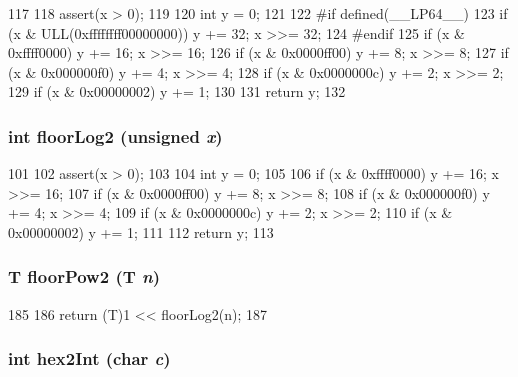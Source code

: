 \begin{DoxyCode}
117 {
118     assert(x > 0);
119 
120     int y = 0;
121 
122 #if defined(__LP64__)
123     if (x & ULL(0xffffffff00000000)) { y += 32; x >>= 32; }
124 #endif
125     if (x & 0xffff0000) { y += 16; x >>= 16; }
126     if (x & 0x0000ff00) { y +=  8; x >>=  8; }
127     if (x & 0x000000f0) { y +=  4; x >>=  4; }
128     if (x & 0x0000000c) { y +=  2; x >>=  2; }
129     if (x & 0x00000002) { y +=  1; }
130 
131     return y;
132 }
\end{DoxyCode}
\hypertarget{intmath_8hh_ad61f5307b84292529da332fee695614e}{
\subsubsection[{floorLog2}]{\setlength{\rightskip}{0pt plus 5cm}int floorLog2 (unsigned {\em x})}}
\label{intmath_8hh_ad61f5307b84292529da332fee695614e}



\begin{DoxyCode}
101 {
102     assert(x > 0);
103 
104     int y = 0;
105 
106     if (x & 0xffff0000) { y += 16; x >>= 16; }
107     if (x & 0x0000ff00) { y +=  8; x >>=  8; }
108     if (x & 0x000000f0) { y +=  4; x >>=  4; }
109     if (x & 0x0000000c) { y +=  2; x >>=  2; }
110     if (x & 0x00000002) { y +=  1; }
111 
112     return y;
113 }
\end{DoxyCode}
\hypertarget{intmath_8hh_a9486f78f0d06687602e134537d9bfe3a}{
\subsubsection[{floorPow2}]{\setlength{\rightskip}{0pt plus 5cm}T floorPow2 (T {\em n})}}
\label{intmath_8hh_a9486f78f0d06687602e134537d9bfe3a}



\begin{DoxyCode}
185 {
186     return (T)1 << floorLog2(n);
187 }
\end{DoxyCode}
\hypertarget{intmath_8hh_a3219427263826ba5f1080f2abe2c3cb9}{
\subsubsection[{hex2Int}]{\setlength{\rightskip}{0pt plus 5cm}int hex2Int (char {\em c})}}
\label{intmath_8hh_a3219427263826ba5f1080f2abe2c3cb9}




